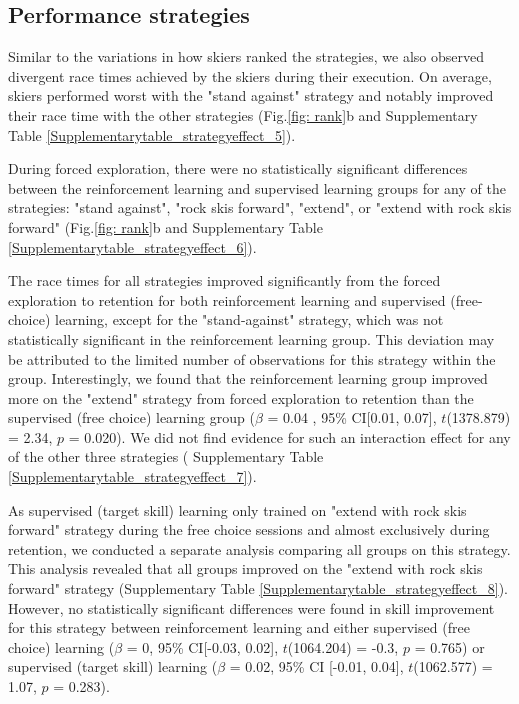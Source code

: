 \documentclass{article}
\begin{document}
\subsection{Performance strategies}\label{subsec5}
Similar to the variations in how skiers ranked the strategies, we also observed divergent race times achieved by the skiers during their execution. On average, skiers performed worst with the "stand against" strategy and notably improved their race time with the other strategies (Fig.\ref{fig: rank}b and Supplementary Table \ref{Supplementarytable_strategyeffect_5}). 

During forced exploration, there were no statistically significant differences between the reinforcement learning and supervised learning groups for any of the strategies:  "stand against", "rock skis forward", "extend", or "extend with rock skis forward" (Fig.\ref{fig: rank}b and Supplementary Table \ref{Supplementarytable_strategyeffect_6}). 

The race times for all strategies improved significantly from the forced exploration to retention for both reinforcement learning and supervised (free-choice) learning, except for the "stand-against" strategy, which was not statistically significant in the reinforcement learning group. This deviation may be attributed to the limited number of observations for this strategy within the group. Interestingly, we found that the reinforcement learning group improved more on the "extend" strategy from forced exploration to retention than the supervised (free choice) learning group ($\beta$ = 0.04 , 95\% CI[0.01, 0.07], $t$(1378.879) = 2.34, $p$ = 0.020). We did not find evidence for such an interaction effect for any of the other three strategies ( Supplementary Table \ref{Supplementarytable_strategyeffect_7}). 

As supervised (target skill) learning only trained on "extend with rock skis forward" strategy during the free choice sessions and almost exclusively during retention, we conducted a separate analysis comparing all groups on this strategy. This analysis revealed that all groups improved on the "extend with rock skis forward" strategy  (Supplementary Table \ref{Supplementarytable_strategyeffect_8}). However, no statistically significant differences were found in skill improvement for this strategy between reinforcement learning and either supervised (free choice) learning ($\beta$ = 0, 95\% CI[-0.03, 0.02], $t$(1064.204) = -0.3, $p$ = 0.765) or supervised (target skill) learning ($\beta$ = 0.02, 95\% CI [-0.01, 0.04], $t$(1062.577) = 1.07, $p$ = 0.283).
\end{document}
